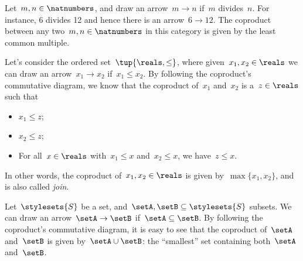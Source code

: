 \begin{example}
    Let~$m,n\in \natnumbers$, and draw an arrow~$m\to n$ if~$m$ divides~$n$.
    For instance, 6 divides 12 and hence there is an arrow~$6\to 12$.
    The coproduct between any two~$m,n\in \natnumbers$ in this category is given by the least common multiple.
\end{example}

\begin{example}
    Let's consider the ordered set~$\tup{\reals,\leq}$, where given~$x_1,x_2\in \reals$ we can draw an arrow~$x_1\to x_2$ if~$x_1\leq x_2$.
    By following the coproduct's commutative diagram, we know that the coproduct of~$x_1$ and~$x_2$ is a~$z\in \reals$ such that
    \begin{itemize}
        \item $x_1\leq z$;
        \item $x_2\leq z$;
        \item For all~$x\in \reals$ with~$x_1\leq x$ and~$x_2\leq x$, we have~$z\leq x$.
    \end{itemize}
    In other words, the coproduct of~$x_1,x_2\in \reals$ is given by~$\max\{x_1,x_2\}$, and is also called \emph{join}.
\end{example}

\begin{example}
    \label{ex:subset_coprod}
    Let~$\stylesets{S}$ be a set, and~$\setA,\setB\subseteq \stylesets{S}$ subsets.
    We can draw an arrow~$\setA\to \setB$ if~$\setA\subseteq \setB$.
    By following the coproduct's commutative diagram, it is easy to see that the coproduct of~$\setA$ and~$\setB$ is given by~$\setA\cup\setB$: the ``smallest'' set containing both~$\setA$ and~$\setB$.
\end{example}

